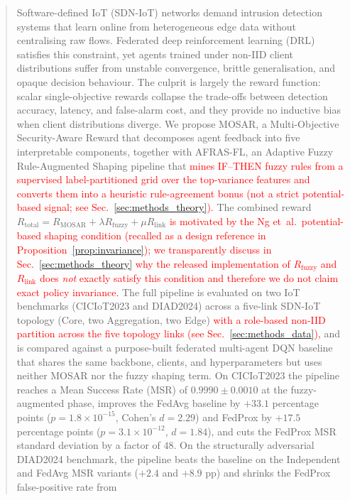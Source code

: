 \documentclass[journal]{IEEEtran}
\newcommand{\rev}[1]{\textcolor{red}{#1}}
\begin{document}
\begin{abstract}
Software-defined IoT (SDN-IoT) networks demand intrusion detection
systems that learn online from heterogeneous edge data without
centralising raw flows. Federated deep reinforcement learning (DRL)
satisfies this constraint, yet agents trained under non-IID client
distributions suffer from unstable convergence, brittle
generalisation, and opaque decision behaviour. The culprit is largely
the reward function: scalar single-objective rewards collapse the
trade-offs between detection accuracy, latency, and false-alarm cost,
and they provide no inductive bias when client distributions diverge.
We propose MOSAR, a Multi-Objective Security-Aware Reward that
decomposes agent feedback into five interpretable components, together
with AFRAS-FL, an Adaptive Fuzzy Rule-Augmented Shaping pipeline that
\rev{mines IF--THEN fuzzy rules from a supervised label-partitioned grid over the top-variance features and converts them into a heuristic rule-agreement bonus (not a strict potential-based signal; see Sec.~\ref{sec:methods_theory}).} The combined reward
$R_{\text{total}} = R_{\text{MOSAR}} + \lambda R_{\text{fuzzy}} + \mu
R_{\text{link}}$ \rev{is motivated by the Ng et~al.\ potential-based shaping condition (recalled as a design reference in Proposition~\ref{prop:invariance}); we transparently discuss in Sec.~\ref{sec:methods_theory} why the released implementation of $R_{\text{fuzzy}}$ and $R_{\text{link}}$ does \emph{not} exactly satisfy this condition and therefore we do not claim exact policy invariance.} The full
pipeline is evaluated on two IoT benchmarks (CICIoT2023 and DIAD2024)
across a five-link SDN-IoT topology (Core, two Aggregation, two Edge)
\rev{with a role-based non-IID partition across the five topology links (see Sec.~\ref{sec:methods_data}),} and is compared against a
purpose-built federated multi-agent DQN baseline that shares the same
backbone, clients, and hyperparameters but uses neither MOSAR nor the
fuzzy shaping term. On CICIoT2023 the pipeline reaches a Mean Success
Rate (MSR) of $0.9990 \pm 0.0010$ at the fuzzy-augmented phase,
improves the FedAvg baseline by $+33.1$ percentage points
($p = 1.8 \times 10^{-15}$, Cohen's $d = 2.29$) and FedProx by
$+17.5$ percentage points ($p = 3.1 \times 10^{-12}$, $d = 1.84$),
and cuts the FedProx MSR standard deviation by a factor of $48$. On
the structurally adversarial DIAD2024 benchmark, the pipeline beats
the baseline on the Independent and FedAvg MSR variants ($+2.4$ and
$+8.9$ pp) and shrinks the FedProx false-positive rate from

\end{abstract}
\end{document}
